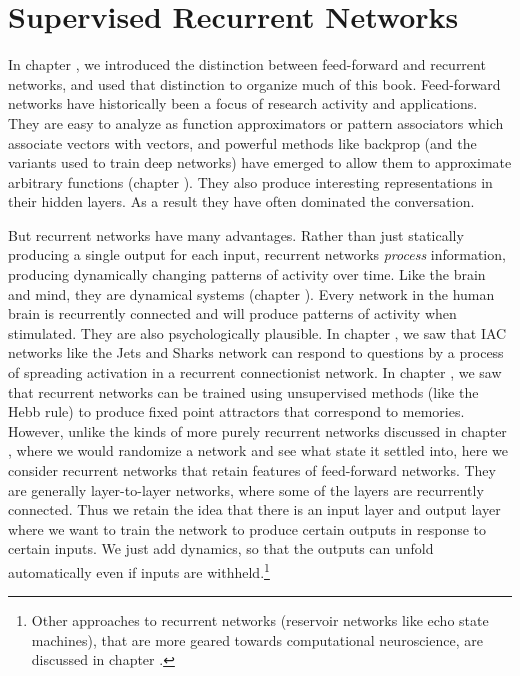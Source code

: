 \chapter{Supervised Recurrent Networks}\label{ch_supervised_recurrent}


In chapter , we introduced the distinction between feed-forward and recurrent networks, and used that distinction to organize much of this book. Feed-forward networks have historically been a focus of research activity and applications. They are easy to analyze as function approximators or pattern associators which  associate vectors with vectors, and powerful methods like backprop (and the variants used to train deep networks) have emerged to allow them to approximate arbitrary functions (chapter ). They also produce interesting representations in their hidden layers. As a result they have often dominated the conversation.

But recurrent networks have many advantages. Rather than just statically producing a single output for each input, recurrent networks \emph{process} information, producing dynamically changing patterns of activity over time. Like the brain and mind, they are dynamical systems (chapter ). Every network in the human brain is recurrently connected and will produce patterns of activity when stimulated. They are also psychologically plausible. In chapter , we saw that IAC networks like the Jets and Sharks network can respond to questions by a process of spreading activation in a recurrent connectionist network. In chapter , we saw that recurrent networks can be trained using unsupervised methods (like the Hebb rule) to produce fixed point attractors that correspond to memories.  However, unlike the kinds of more purely recurrent networks discussed in chapter , where we would randomize a network and see what state it settled into, here we consider recurrent networks that retain features of feed-forward networks. They are generally layer-to-layer networks,  where some of the layers are recurrently connected. Thus we retain the idea that there is an input layer and output layer where we want to train the network to produce certain outputs in response to certain inputs.  We just add dynamics, so that the outputs can unfold automatically even if inputs are withheld.\footnote{Other approaches to recurrent networks (reservoir networks like echo state machines), that are more geared towards computational neuroscience, are discussed in chapter .}

